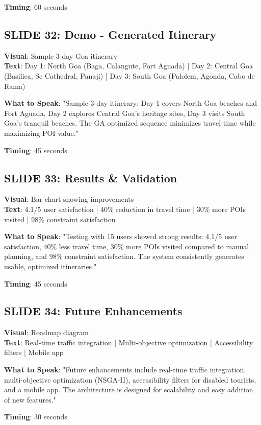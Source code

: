 \documentclass[12pt]{article}
\begin{document}
\textbf{Timing}: 60 seconds

\subsection{SLIDE 32: Demo - Generated Itinerary}
\textbf{Visual}: Sample 3-day Goa itinerary \\
\textbf{Text}: Day 1: North Goa (Baga, Calangute, Fort Aguada) | Day 2: Central Goa (Basilica, Se Cathedral, Panaji) | Day 3: South Goa (Palolem, Agonda, Cabo de Rama)

\textbf{What to Speak}:
"Sample 3-day itinerary: Day 1 covers North Goa beaches and Fort Aguada, Day 2 explores Central Goa's heritage sites, Day 3 visits South Goa's tranquil beaches. The GA optimized sequence minimizes travel time while maximizing POI value."

\textbf{Timing}: 45 seconds

\subsection{SLIDE 33: Results \& Validation}
\textbf{Visual}: Bar chart showing improvements \\
\textbf{Text}: 4.1/5 user satisfaction | 40\% reduction in travel time | 30\% more POIs visited | 98\% constraint satisfaction

\textbf{What to Speak}:
"Testing with 15 users showed strong results: 4.1/5 user satisfaction, 40\% less travel time, 30\% more POIs visited compared to manual planning, and 98\% constraint satisfaction. The system consistently generates usable, optimized itineraries."

\textbf{Timing}: 45 seconds

\subsection{SLIDE 34: Future Enhancements}
\textbf{Visual}: Roadmap diagram \\
\textbf{Text}: Real-time traffic integration | Multi-objective optimization | Accessibility filters | Mobile app

\textbf{What to Speak}:
"Future enhancements include real-time traffic integration, multi-objective optimization (NSGA-II), accessibility filters for disabled tourists, and a mobile app. The architecture is designed for scalability and easy addition of new features."

\textbf{Timing}: 30 seconds
\end{document}
